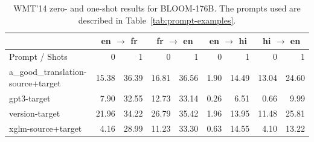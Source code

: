 \begin{table}[ht!]
\centering\small
\addtolength{\tabcolsep}{-2.5pt}
\begin{tabular}{lrr|rr|rr|rr}
\toprule
 & \multicolumn{2}{c}{en $\rightarrow$ fr} & \multicolumn{2}{c}{fr $\rightarrow$ en } & \multicolumn{2}{c}{en $\rightarrow$ hi} & \multicolumn{2}{c}{hi $\rightarrow$ en} \\
\midrule
Prompt / Shots  & 0 & 1 & 0 & 1 & 0 & 1 & 0 & 1 \\
\midrule
a\_good\_translation-source+target & 15.38 & 36.39 & 16.81 &  36.56 & 1.90 & 14.49 & 13.04 & 24.60  \\
gpt3-target     & 7.90 & 32.55 & 12.73 & 33.14 & 0.26 & 6.51 & 0.66 & 9.99 \\
version-target  & 21.96 & 34.22 & 26.79 & 35.42 & 1.96 & 13.95 & 11.48 & 25.81 \\
xglm-source+target     & 4.16 & 28.99 & 11.23 & 33.30 & 0.63 & 14.55 & 4.10 & 13.22 \\
\bottomrule
\end{tabular}%
\caption{WMT'14 zero- and one-shot results for BLOOM-176B. The prompts used are described in Table~\ref{tab:prompt-examples}.}%
\label{tab:WMT-14enfr-byprompts-0shot}
\end{table}


